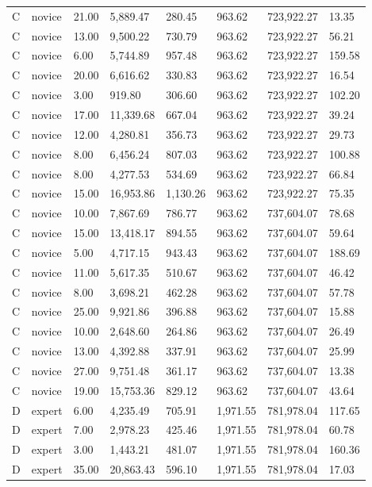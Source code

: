 \documentclass[
  english,
  man,floatsintext]{apa6}
\begin{document}
\begin{table}[h]
\begin{center}
\begin{threeparttable}
{\begin{tabular}{llllllll}
C & novice & 21.00 & 5,889.47 & 280.45 & 963.62 & 723,922.27 & 13.35\\
C & novice & 13.00 & 9,500.22 & 730.79 & 963.62 & 723,922.27 & 56.21\\
C & novice & 6.00 & 5,744.89 & 957.48 & 963.62 & 723,922.27 & 159.58\\
C & novice & 20.00 & 6,616.62 & 330.83 & 963.62 & 723,922.27 & 16.54\\
C & novice & 3.00 & 919.80 & 306.60 & 963.62 & 723,922.27 & 102.20\\
C & novice & 17.00 & 11,339.68 & 667.04 & 963.62 & 723,922.27 & 39.24\\
C & novice & 12.00 & 4,280.81 & 356.73 & 963.62 & 723,922.27 & 29.73\\
C & novice & 8.00 & 6,456.24 & 807.03 & 963.62 & 723,922.27 & 100.88\\
C & novice & 8.00 & 4,277.53 & 534.69 & 963.62 & 723,922.27 & 66.84\\
C & novice & 15.00 & 16,953.86 & 1,130.26 & 963.62 & 723,922.27 & 75.35\\
C & novice & 10.00 & 7,867.69 & 786.77 & 963.62 & 737,604.07 & 78.68\\
C & novice & 15.00 & 13,418.17 & 894.55 & 963.62 & 737,604.07 & 59.64\\
C & novice & 5.00 & 4,717.15 & 943.43 & 963.62 & 737,604.07 & 188.69\\
C & novice & 11.00 & 5,617.35 & 510.67 & 963.62 & 737,604.07 & 46.42\\
C & novice & 8.00 & 3,698.21 & 462.28 & 963.62 & 737,604.07 & 57.78\\
C & novice & 25.00 & 9,921.86 & 396.88 & 963.62 & 737,604.07 & 15.88\\
C & novice & 10.00 & 2,648.60 & 264.86 & 963.62 & 737,604.07 & 26.49\\
C & novice & 13.00 & 4,392.88 & 337.91 & 963.62 & 737,604.07 & 25.99\\
C & novice & 27.00 & 9,751.48 & 361.17 & 963.62 & 737,604.07 & 13.38\\
C & novice & 19.00 & 15,753.36 & 829.12 & 963.62 & 737,604.07 & 43.64\\
D & expert & 6.00 & 4,235.49 & 705.91 & 1,971.55 & 781,978.04 & 117.65\\
D & expert & 7.00 & 2,978.23 & 425.46 & 1,971.55 & 781,978.04 & 60.78\\
D & expert & 3.00 & 1,443.21 & 481.07 & 1,971.55 & 781,978.04 & 160.36\\
D & expert & 35.00 & 20,863.43 & 596.10 & 1,971.55 & 781,978.04 & 17.03\\

\end{tabular}}
\end{threeparttable}
\end{center}
\end{table}
\end{document}
